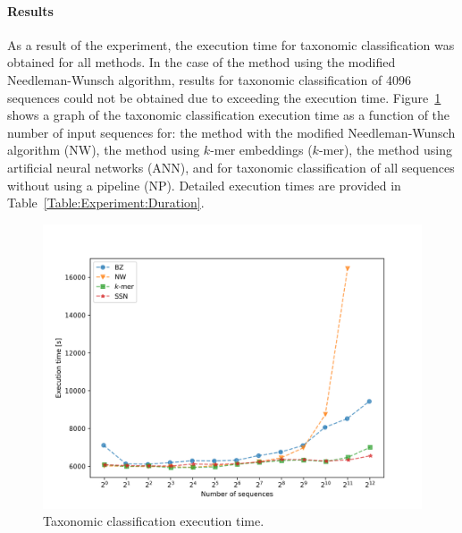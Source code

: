 \documentclass[pdflatex,sn-vancouver-num]{sn-jnl}%
\begin{document}
                \paragraph{Results}
                As a result of the experiment, the execution time for taxonomic classification was obtained for all methods. In the case of the method using the modified Needleman-Wunsch algorithm, results for taxonomic classification of 4096 sequences could not be obtained due to exceeding the execution time. Figure~\ref{Picture:Experiment:Duration} shows a graph of the taxonomic classification execution time as a function of the number of input sequences for: the method with the modified Needleman-Wunsch algorithm (NW), the method using $k$-mer embeddings ($k$-mer), the method using artificial neural networks (ANN), and for taxonomic classification of all sequences without using a pipeline (NP). Detailed execution times are provided in Table~\ref{Table:Experiment:Duration}.

                \begin{figure}[!htb]
                    \begin{center}
                        \includegraphics[width=\textwidth]{picture_experiment_duration.png}
                    \end{center}
                    \caption{
                        Taxonomic classification execution time.
                    }\label{Picture:Experiment:Duration}
                \end{figure}
\end{document}
